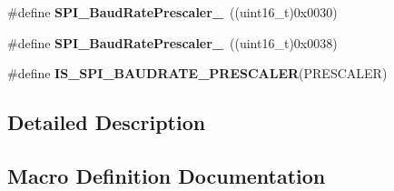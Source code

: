 \begin{DoxyCompactItemize}
\item 
\hypertarget{group___s_p_i___baud_rate___prescaler_gafa6c39c3ee16a08730356a5cd30f3648}{}\#define {\bfseries S\+P\+I\+\_\+\+Baud\+Rate\+Prescaler\+\_}~((uint16\+\_\+t)0x0030)\label{group___s_p_i___baud_rate___prescaler_gafa6c39c3ee16a08730356a5cd30f3648}

\item 
\hypertarget{group___s_p_i___baud_rate___prescaler_ga1e1aa6406f0e88ac557ba49fb8069e3e}{}\#define {\bfseries S\+P\+I\+\_\+\+Baud\+Rate\+Prescaler\+\_}~((uint16\+\_\+t)0x0038)\label{group___s_p_i___baud_rate___prescaler_ga1e1aa6406f0e88ac557ba49fb8069e3e}

\item 
\#define {\bfseries I\+S\+\_\+\+S\+P\+I\+\_\+\+B\+A\+U\+D\+R\+A\+T\+E\+\_\+\+P\+R\+E\+S\+C\+A\+L\+E\+R}(P\+R\+E\+S\+C\+A\+L\+E\+R)
\end{DoxyCompactItemize}


\subsection{Detailed Description}


\subsection{Macro Definition Documentation}
\hypertarget{group___s_p_i___baud_rate___prescaler_gae79f46ed9f91e39dc1f6912cb25fc716}{}

